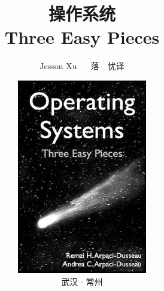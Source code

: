 
\title{{\Huge 操作系统}\\{\LARGE Three Easy Pieces}}
\author{Jesson Xu ~~ 落~~忧\hspace{1em}译}
\date{\vspace*{3cm}\centering\includegraphics[totalheight=1.5in]{fig/operating-systems.jpeg}\\武汉 $\cdot$ 常州}
\maketitle
